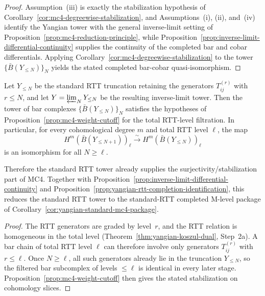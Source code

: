 \begin{proof}
Assumption~\textup{(iii)} is exactly the stabilization hypothesis of
Corollary~\ref{cor:mc4-degreewise-stabilization}, and
Assumptions~\textup{(i)}, \textup{(ii)}, and~\textup{(iv)} identify the
Yangian tower with the general inverse-limit setting of
Proposition~\ref{prop:mc4-reduction-principle}, while
Proposition~\ref{prop:inverse-limit-differential-continuity} supplies
the continuity of the completed bar and cobar differentials.
Applying Corollary~\ref{cor:mc4-degreewise-stabilization} to the tower
$\{\bar B(Y_{\le N})\}_N$ yields the stated completed bar-cobar
quasi-isomorphism.
\end{proof}

\begin{corollary}
\label{cor:yangian-weight-cutoff}
Let $Y_{\le N}$ be the standard RTT truncation retaining the generators
$T_{ij}^{(r)}$ with $r \le N$, and let
$Y = \varprojlim_N Y_{\le N}$ be the resulting inverse-limit tower.
Then the tower of bar complexes $\{\bar B(Y_{\le N})\}_N$ satisfies the
hypotheses of Proposition~\ref{prop:mc4-weight-cutoff} for the total
RTT-level filtration.  In particular, for every cohomological degree
$m$ and total RTT level $\ell$, the map
\[
H^m(\bar B(Y_{\le N+1}))_\ell \xrightarrow{\sim}
H^m(\bar B(Y_{\le N}))_\ell
\]
is an isomorphism for all $N \ge \ell$.

Therefore the standard RTT tower already supplies the
surjectivity/stabilization part of MC4.  Together with
Proposition~\ref{prop:inverse-limit-differential-continuity} and
Proposition~\ref{prop:yangian-rtt-completion-identification}, this
reduces the standard RTT tower to the standard-RTT completed M-level
package of Corollary~\ref{cor:yangian-standard-mc4-package}.
\end{corollary}

\begin{proof}
The RTT generators are graded by level~$r$, and the RTT relation is
homogeneous in the total level (Theorem~\ref{thm:yangian-koszul-dual},
Step~2a).  A bar chain of total RTT level $\ell$ can therefore involve
only generators $T_{ij}^{(r)}$ with $r \le \ell$.  Once $N \ge \ell$,
all such generators already lie in the truncation $Y_{\le N}$, so the
filtered bar subcomplex of levels $\le \ell$ is identical in every
later stage.  Proposition~\ref{prop:mc4-weight-cutoff} then gives the
stated stabilization on cohomology slices.
\end{proof}

